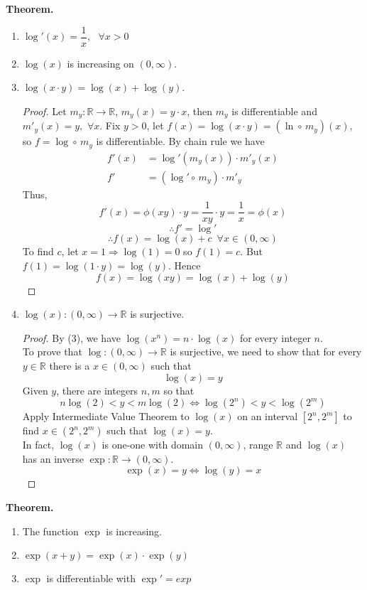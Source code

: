 \documentclass[10pt,letterpaper]{article}
\begin{document}
	\textbf{Theorem. } 
	\begin{enumerate}[(1)]
	\item $\log'(x) = \dfrac{1}{x}, \,\,\,\, \forall x > 0$
	\item $\log(x)$ is increasing on $(0, \infty)$.
	\item $\log(x \cdot y) = \log(x) + \log(y)$.
	\begin{proof}
	Let $m_y : \mathbb{R} \rightarrow \mathbb{R}$, $m_y(x) = y \cdot x$, then 
	$m_y$ is differentiable and $m'_y(x) = y, \,\, \forall x$. Fix $y > 0$, 
	let $f(x) = \log(x \cdot y) = (\ln \circ \, m_y)(x)$, so $f = \log \circ \, m_y$ is differentiable.
	By chain rule we have
	\begin{align*}
		f'(x) &= \log'(m_y(x)) \cdot m'_y(x) \\
		f' &= (\log' \circ \, m_y) \cdot m'_y
	\end{align*}
	Thus,
	$$f'(x) = \phi(xy) \cdot y = \dfrac{1}{xy} \cdot y = \dfrac{1}{x} = \phi(x)$$
	$$\therefore f' = \log'$$
	$$\therefore f(x) = \log(x) + c \, \, \, \forall x \in (0, \infty)$$	
	To find $c$, let $x = 1 \Rightarrow \log(1) = 0$ so $f(1) = c$. But $f(1) = \log(1 \cdot y)
	= \log(y)$. Hence
	$$f(x) = \log(xy) = \log(x) + \log(y)$$	
	\end{proof}
	
	\item $\log(x) : (0, \infty) \rightarrow \mathbb{R}$ is surjective.
	\begin{proof}
	By (3), we have $\log(x^n) = n \cdot \log(x)$ for every integer $n$. \\
	To prove that $\log: (0, \infty) \rightarrow \mathbb{R}$ is surjective, we need to show
	that for every $y \in \mathbb{R}$ there is a $x \in (0, \infty)$ such that
	$$\log(x) = y$$
	Given $y$, there are integers $n, m$ so that
	$$n\log(2) < y  < m\log(2) \Leftrightarrow \log(2^n) < y < \log(2^m)$$
	Apply Intermediate Value Theorem to $\log(x)$ on an interval $[2^n, 2^m]$ to find $x \in (2^n, 2^m)$ such that
	$\log(x) = y$. \\
	In fact, $\log(x)$ is one-one with domain $(0, \infty)$, range $\mathbb{R}$ and $\log(x)$ has an inverse
	$\exp : \mathbb{R} \rightarrow (0, \infty)$.
	$$\exp(x) = y \Leftrightarrow \log(y) = x$$
	\end{proof}
	
	\end{enumerate}
	
	
	{\color{orange}\textbf{Theorem.} } 
	\begin{enumerate}[(1)]
	\item The function $\exp$ is increasing. 
	\item $\exp(x + y) = \exp(x) \cdot \exp(y)$
	\item $\exp$ is differentiable with $\exp' = exp$	
	\end{enumerate}
	
\end{document}
